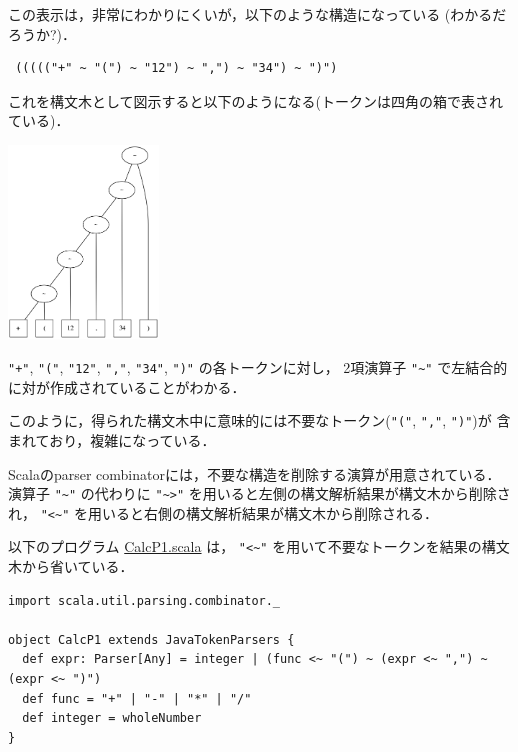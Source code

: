 \documentclass[a4j]{jsarticle}
\begin{document}
この表示は，非常にわかりにくいが，以下のような構造になっている (わかるだろうか?)．
\begin{verbatim}
 ((((("+" ~ "(") ~ "12") ~ ",") ~ "34") ~ ")")
\end{verbatim}

これを構文木として図示すると以下のようになる(トークンは四角の箱で表されている)．

\begin{center}

\includegraphics[width=0.3\textwidth]{images/scala-parse-tree1_aa424b059f845dce7ee0150628a229e0e65b7e0f.png}

\end{center}

\texttt{"+"}, \texttt{"("}, \texttt{"12"}, \texttt{","}, \texttt{"34"}, \texttt{")"} の各トークンに対し，
2項演算子 \texttt{"\textasciitilde{}"} で左結合的に対が作成されていることがわかる．

このように，得られた構文木中に意味的には不要なトークン(\texttt{"("}, \texttt{","}, \texttt{")"})が
含まれており，複雑になっている．

Scalaのparser combinatorには，不要な構造を削除する演算が用意されている．
演算子 \texttt{"\textasciitilde{}"} の代わりに  \texttt{"\textasciitilde{}>"} を用いると左側の構文解析結果が構文木から削除され，
\texttt{"<\textasciitilde{}"} を用いると右側の構文解析結果が構文木から削除される．

以下のプログラム \href{file:///home/tamura/lect2/ProLang/2018/org/prog/parser/CalcP1.scala}{CalcP1.scala} は， \texttt{"<\textasciitilde{}"} を用いて不要なトークンを結果の構文木から省いている．


\begin{verbatim}
import scala.util.parsing.combinator._

object CalcP1 extends JavaTokenParsers {
  def expr: Parser[Any] = integer | (func <~ "(") ~ (expr <~ ",") ~ (expr <~ ")")
  def func = "+" | "-" | "*" | "/"
  def integer = wholeNumber
}
\end{verbatim}
\end{document}
